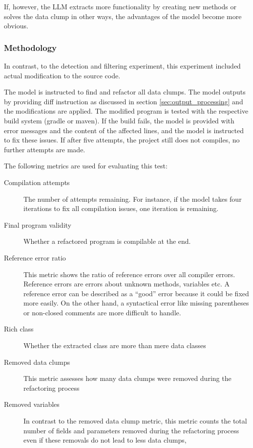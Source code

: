 If, however, the \ac{LLM} extracts more functionality by creating new methods or solves the data clump in other ways, the advantages of the model become more obvious.



\subsubsection{Methodology}

In contrast, to the detection and filtering experiment, this experiment included actual modification to the source code. 

The model is instructed to find and refactor all data clumps. 
The model outputs by providing diff instruction as discussed in section \ref{sec:output_processing} and the modifications are applied.  The modified program is tested with the respective build system (gradle or maven). If the build fails, the model is provided with error messages and the content of the affected lines, and the model is instructed to fix these issues. If after five attempts, the project still does not compiles, no further attempts are made. 

The following metrics are used for evaluating this test:

\begin{description}
    \item [Compilation attempts] The number of attempts remaining. For instance, if the model takes four iterations to fix all compilation issues, one iteration is remaining. 
    \item[Final program validity] Whether a refactored program is compilable at the end. 
   \item [Reference error ratio] This metric shows the ratio of reference errors over all compiler errors. Reference errors are errors about unknown methods, variables etc.  A reference error can be described as  a \enquote{good} error because it could be fixed more easily. On the other hand, a syntactical error like missing parentheses or non-closed comments are more difficult to handle. 
    \item [Rich class] Whether the extracted class are more than mere data classes
   
    \item [Removed data clumps] This metric assesses how many data clumps were removed during the refactoring process

    \item [Removed variables] In contrast to the removed data clump metric, this metric counts the total number of fields and parameters removed during the refactoring process even if these removals do not lead to less data clumps, 
\end{description}



